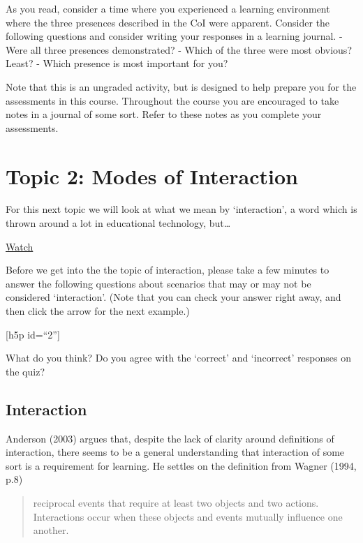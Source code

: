 \documentclass[
]{book}
\begin{document}
As you read, consider a time where you experienced a learning environment where the three presences described in the CoI were apparent. Consider the following questions and consider writing your responses in a learning journal.
- Were all three presences demonstrated?
- Which of the three were most obvious? Least?
- Which presence is most important for you?

Note that this is an ungraded activity, but is designed to help prepare you for the assessments in this course. Throughout the course you are encouraged to take notes in a journal of some sort. Refer to these notes as you complete your assessments.

\hypertarget{topic-2-modes-of-interaction}{%
\section*{Topic 2: Modes of Interaction}\label{topic-2-modes-of-interaction}}

For this next topic we will look at what we mean by `interaction', a word which is thrown around a lot in educational technology, but\ldots{}

\href{https://youtu.be/G2y8Sx4B2Sk}{Watch}

Before we get into the the topic of interaction, please take a few minutes to answer the following questions about scenarios that may or may not be considered `interaction'.
(Note that you can check your answer right away, and then click the arrow for the next example.)

{[}h5p id=``2''{]}

What do you think? Do you agree with the `correct' and `incorrect' responses on the quiz?

\hypertarget{interaction}{%
\subsection*{Interaction}\label{interaction}}

Anderson (2003) argues that, despite the lack of clarity around definitions of interaction, there seems to be a general understanding that interaction of some sort is a requirement for learning. He settles on the definition from Wagner (1994, p.8)

\begin{quote}
reciprocal events that require at least two objects and two actions. Interactions occur when these objects and events mutually influence one another.
\end{quote}
\end{document}
